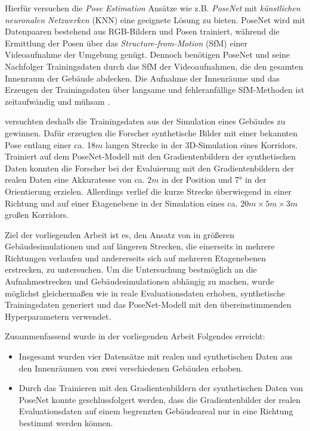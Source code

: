 Hierfür versuchen die \textit{Pose Estimation} Ansätze wie z.B. \textit{PoseNet} \cite{kendallPoseNetConvolutionalNetwork2015} mit \textit{künstlichen neuronalen Netzwerken} (KNN) eine geeignete Lösung zu bieten. PoseNet wird mit Datenpaaren bestehend aus RGB-Bildern und Posen trainiert, während die Ermittlung der Posen über das \textit{Structure-from-Motion} (SfM) einer Videoaufnahme der Umgebung genügt. Dennoch benötigen PoseNet und seine Nachfolger \cite{kendallModellingUncertaintyDeep2016, walchImageBasedLocalizationUsing2017, kendallGeometricLossFunctions2017, clarkVidLocDeepSpatioTemporal2017} Trainingsdaten durch das SfM der Videoaufnahmen, die den gesamten Innenraum der Gebäude abdecken. Die Aufnahme der Innenräume und das Erzeugen der Trainingsdaten über langsame und fehleranfällige SfM-Methoden ist zeitaufwändig und mühsam \cite{acharyaBIMPoseNetIndoorCamera2019}.

\citet{acharyaBIMPoseNetIndoorCamera2019} versuchten deshalb die Trainingsdaten aus der Simulation eines Gebäudes zu gewinnen. Dafür erzeugten die Forscher synthetische Bilder mit einer bekannten Pose entlang einer ca. 18$m$ langen Strecke in der 3D-Simulation eines Korridors. Trainiert auf dem PoseNet-Modell mit den Gradientenbildern der synthetischen Daten konnten die Forscher \citet{acharyaBIMPoseNetIndoorCamera2019} bei der Evaluierung mit den Gradientenbildern der realen Daten eine Akkuratesse von ca. $2m$ in der Position und 7° in der Orientierung erzielen. 
Allerdings verlief die kurze Strecke überwiegend in einer Richtung und auf einer Etagenebene in der Simulation eines ca. $20m \times 5m \times 3m$ großen Korridors.


Ziel der vorliegenden Arbeit ist es, den Ansatz von \citet{acharyaBIMPoseNetIndoorCamera2019} in größeren Gebäudesimulationen und auf längeren Strecken, die einerseits in mehrere Richtungen verlaufen und andererseits sich auf mehreren Etagenebenen erstrecken, zu untersuchen. Um die Untersuchung bestmöglich an die Aufnahmestrecken und Gebäudesimulationen abhängig zu machen, wurde möglichst gleichermaßen wie in \cite{acharyaBIMPoseNetIndoorCamera2019} reale Evaluationsdaten erhoben, synthetische Trainingsdaten generiert und das PoseNet-Modell mit den übereinstimmenden Hyperparametern verwendet.

Zusammenfassend wurde in der vorliegenden Arbeit Folgendes erreicht:
\begin{itemize}
	\item
	Insgesamt wurden vier Datensätze mit realen und synthetischen Daten aus den Innenräumen von zwei verschiedenen Gebäuden erhoben.
	\item 
	 Durch das Trainieren mit den Gradientenbildern der synthetischen Daten von Pose\-Net konnte geschlussfolgert werden, dass die Gradientenbilder der realen Evaluationsdaten auf einem begrenzten Gebäudeareal nur in eine Richtung bestimmt werden können.
\end{itemize}





